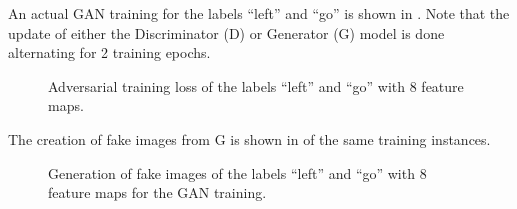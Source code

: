 \FloatBarrier
\noindent
An actual GAN training for the labels \enquote{left} and \enquote{go} is shown in .
Note that the update of either the Discriminator (D) or Generator (G) model is done alternating for 2 training epochs.
\begin{figure}[!ht]
  \centering
  \caption{Adversarial training loss of the labels \enquote{left} and \enquote{go} with 8 feature maps.}
  \label{fig:nn_adv_loss_label}
\end{figure}
\FloatBarrier
\noindent
The creation of fake images from G is shown in  of the same training instances.
\begin{figure}[!ht]
  \centering
  \caption{Generation of fake images of the labels \enquote{left} and \enquote{go} with 8 feature maps for the GAN training.}
  \label{fig:nn_adv_fakes_label}
\end{figure}
\FloatBarrier
\noindent

